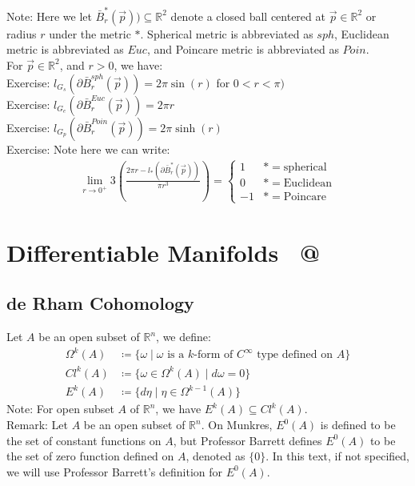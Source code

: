 \documentclass[11pt,oneside]{book}
\makeatletter
\theoremstyle{break}
\theoremstyle{break}
\newcommand{\R}{\mathbb{R}}
\newcommand{\note}{\color{red}Note: \color{black}}
\newcommand{\remark}{\color{blue}Remark: \color{black}}
\newcommand{\exercise}{\color{green}Exercise: \color{black}}
\newcommand*{\rom}[1]{\expandafter\@slowromancap\romannumeral #1@}
\makeatother
\begin{document}
\note Here we let $\bar{B}_{r}^{*}(\vec{p})) \subseteq \R^2$ denote a closed ball centered at $\vec{p}\in \R^2$ or radius $r$ under the metric $*$. Spherical metric is abbreviated as $sph$, Euclidean metric is abbreviated as $Euc$, and Poincare metric is abbreviated as $Poin$.\\

For $\vec{p}\in \R^2$, and $r >0$, we have:\\
\exercise $l_{G_s}(\partial \bar{B}_{r}^{sph}(\vec{p})) = 2\pi \sin(r)$ for $0<r<\pi)$\\
\exercise $l_{G_e}(\partial \bar{B}_{r}^{Euc}(\vec{p})) = 2\pi r$\\
\exercise $l_{G_p}(\partial \bar{B}_{r}^{Poin}(\vec{p})) = 2\pi \sinh(r)$\\


\exercise Note here we can write:
\begin{align*}
\lim_{r\to 0^+} 3\left(\frac{2\pi r - l_{*}(\partial \bar{B}_r^{*}(\vec{p}))}{\pi r^3}\right) = \begin{cases} 
1 &  *=\text{spherical}\\
0 &  *=\text{Euclidean}\\
-1 & *=\text{Poincare}
\end{cases}
\end{align*}


\newpage
\chapter{Differentiable Manifolds \ \rom{3}}
\setcounter{section}{42}
\section[de Rham Cohomology]{\color{red} de Rham Cohomology\color{black}}
Let $A$ be an open subset of $\R^n$, we define: 
\begin{align*}
\Omega^k(A) &\coloneqq \{\omega \mid \omega\text{ is a }k\text{-form of }C^\infty \text{ type defined on }A\}\\
Cl^k(A) &\coloneqq \{\omega \in \Omega^k(A) \mid d\omega = 0 \}\\
E^k(A) &\coloneqq \{ d\eta \mid \eta \in \Omega^{k-1}(A) \}
\end{align*}
\note For open subset $A$ of $\R^n$, we have $E^k(A) \subseteq Cl^k(A)$.\\

\remark Let $A$ be an open subset of $\R^n$. On Munkres, $E^0(A)$ is defined to be the set of constant functions on $A$, but Professor Barrett defines $E^0(A)$ to be the set of zero function defined on $A$, denoted as $\{0\}$. In this text, if not specified, we will use Professor Barrett's definition for $E^0(A)$. 
\end{document}
